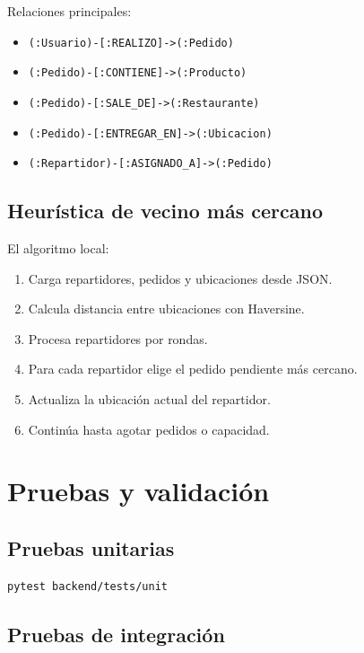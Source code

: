 \documentclass[12pt,letterpaper]{article}
\def\codefile#1{\nolinkurl{#1}}
\begin{document}
Relaciones principales:

\begin{itemize}
    \item \codefile{(:Usuario)-[:REALIZO]->(:Pedido)}
    \item \codefile{(:Pedido)-[:CONTIENE]->(:Producto)}
    \item \codefile{(:Pedido)-[:SALE\_DE]->(:Restaurante)}
    \item \codefile{(:Pedido)-[:ENTREGAR\_EN]->(:Ubicacion)}
    \item \codefile{(:Repartidor)-[:ASIGNADO\_A]->(:Pedido)}
\end{itemize}

\subsection{Heurística de vecino más cercano}

El algoritmo local:

\begin{enumerate}
    \item Carga repartidores, pedidos y ubicaciones desde JSON.
    \item Calcula distancia entre ubicaciones con Haversine.
    \item Procesa repartidores por rondas.
    \item Para cada repartidor elige el pedido pendiente más cercano.
    \item Actualiza la ubicación actual del repartidor.
    \item Continúa hasta agotar pedidos o capacidad.
\end{enumerate}

\section{Pruebas y validación}

\subsection{Pruebas unitarias}

\begin{lstlisting}[language=bash]
pytest backend/tests/unit
\end{lstlisting}

\subsection{Pruebas de integración}
\end{document}
